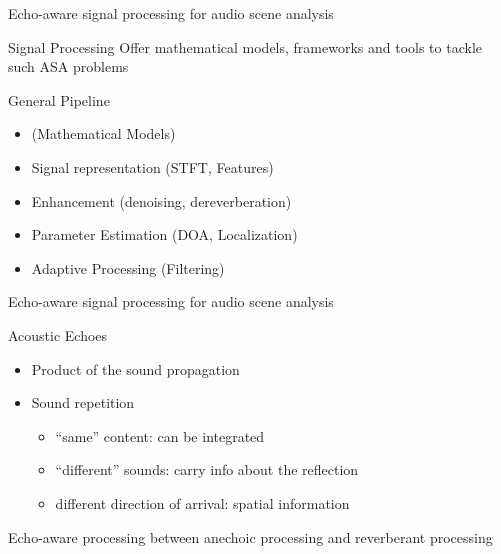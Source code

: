 \begin{frame}{Echo-aware \alert{signal processing} for audio scene analysis}

    \begin{mydefblock}{Signal Processing}
        Offer mathematical models, frameworks and tools to tackle such ASA problems
    \end{mydefblock}

    \begin{block}{General Pipeline}
        \begin{itemize}
            \item (Mathematical Models)
            \item Signal representation (STFT, Features)
            \item Enhancement (denoising, dereverberation)
            \item Parameter Estimation (DOA, Localization)
            \item Adaptive Processing (Filtering)
        \end{itemize}
    \end{block}
\end{frame}

\begin{frame}{\alert{Echo-aware} signal processing for audio scene analysis}

    \begin{mydefblock}{Acoustic Echoes}
        \begin{itemize}
            \item Product of the sound propagation
            \item Sound repetition
            \begin{itemize}
                \item ``same'' content: can be integrated
                \item ``different'' sounds: carry info about the reflection
                \item different direction of arrival: spatial information
            \end{itemize}
        \end{itemize}
    \end{mydefblock}

    \begin{block}{Echo-aware processing}
        between anechoic processing and reverberant processing
    \end{block}

\end{frame}

